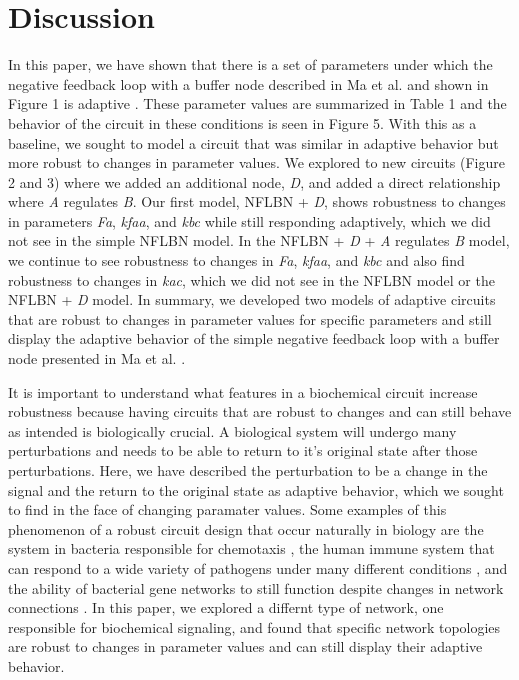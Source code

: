 \documentclass{article}
\begin{document}
\section{Discussion}

In this paper, we have shown that there is a set of parameters under which the negative feedback loop with a buffer node described in Ma et al. and shown in Figure 1 is adaptive \cite{challenge2paperD2L}. These parameter values are summarized in Table 1 and the behavior of the circuit in these conditions is seen in Figure 5. With this as a baseline, we sought to model a circuit that was similar in adaptive behavior but more robust to changes in parameter values. We explored to new circuits (Figure 2 and 3) where we added an additional node, \textit{D}, and added a direct relationship where \textit{A} regulates \textit{B}. Our first model, NFLBN + \textit{D}, shows robustness to changes in parameters \textit{Fa}, \textit{kfaa}, and \textit{kbc} while still responding adaptively, which we did not see in the simple NFLBN model. In the NFLBN + \textit{D} + \textit{A} regulates \textit{B} model, we continue to see robustness to changes in \textit{Fa}, \textit{kfaa}, and \textit{kbc} and also find robustness to changes in \textit{kac}, which we did not see in the NFLBN model or the NFLBN + \textit{D} model. In summary, we developed two models of adaptive circuits that are robust to changes in parameter values for specific parameters and still display the adaptive behavior of the simple negative feedback loop with a buffer node presented in Ma et al. \cite{challenge2paperD2L}. 

It is important to understand what features in a biochemical circuit increase robustness because having circuits that are robust to changes and can still behave as intended is biologically crucial. A biological system will undergo many perturbations and needs to be able to return to it's original state after those perturbations. Here, we have described the perturbation to be a change in the signal and the return to the original state as adaptive behavior, which we sought to find in the face of changing paramater values. Some examples of this phenomenon of a robust circuit design that occur naturally in biology are the system in bacteria responsible for chemotaxis \cite{chemotaxis}, the human immune system that can respond to a wide variety of pathogens under many different conditions \cite{immune}, and the ability of bacterial gene networks to still function despite changes in network connections \cite{gene}. In this paper, we explored a differnt type of network, one responsible for biochemical signaling, and found that specific network topologies are robust to changes in parameter values and can still display their adaptive behavior. 
\end{document}
